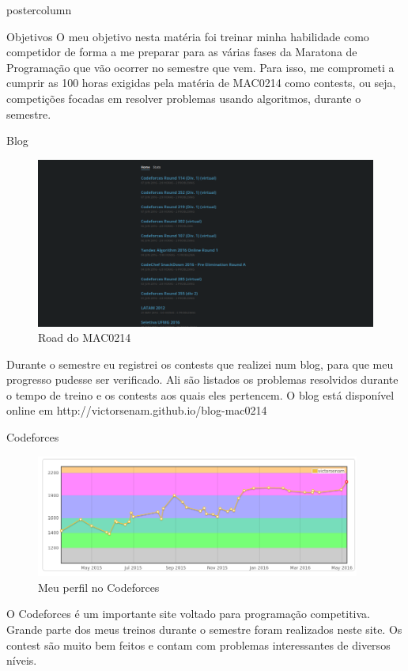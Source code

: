 \documentclass[final]{beamer}
\begin{document}
\begin{frame}
\begin{columns}
\begin{column}{.5\textwidth}
\begin{beamercolorbox}[center,wd=\textwidth]{postercolumn}
\begin{minipage}[T]{.95\textwidth}
{    \begin{block}{Objetivos}
        O meu objetivo nesta matéria foi treinar minha habilidade como competidor de forma a me preparar para as várias fases da Maratona de Programação que vão ocorrer no semestre que vem. Para isso, me comprometi a cumprir as 100 horas exigidas pela matéria de MAC0214 como contests, ou seja, competições focadas em resolver problemas usando algoritmos, durante o semestre.
        \end{block}
    \begin{block}{Blog}
        \begin{figure}[h]
        \includegraphics[scale=.40]{blog.png}
    \caption{Road do MAC0214}
    \end{figure}
    Durante o semestre eu registrei os contests que realizei num blog, para que meu progresso pudesse ser verificado. Ali são listados os problemas resolvidos durante o tempo de treino e os contests aos quais eles pertencem. O blog está disponível online em http://victorsenam.github.io/blog-mac0214
        \end{block}
    \begin{block}{Codeforces}
    \begin{figure}
    \centering
        \includegraphics[width=0.95\textwidth]{codeforces.png}
    \caption{Meu perfil no Codeforces}
    \end{figure} 
    O Codeforces é um importante site voltado para programação competitiva. Grande parte dos meus treinos durante o semestre foram realizados neste site. Os contest são muito bem feitos e contam com problemas interessantes de diversos níveis.


\end{block}}
\end{minipage}
\end{beamercolorbox}
\end{column}
\end{columns}
\end{frame}
\end{document}
